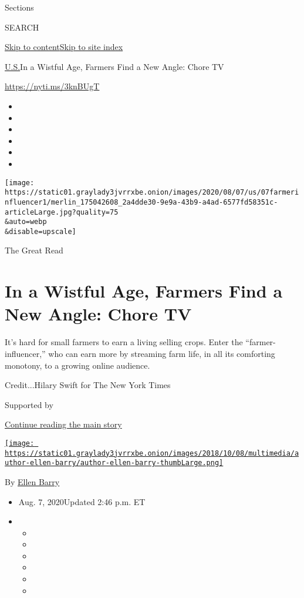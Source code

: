 Sections

SEARCH

\protect\hyperlink{site-content}{Skip to
content}\protect\hyperlink{site-index}{Skip to site index}

\href{/section/us}{U.S.}\textbar{}In a Wistful Age, Farmers Find a New
Angle: Chore TV

\url{https://nyti.ms/3knBUgT}

\begin{itemize}
\item
\item
\item
\item
\item
\item
\end{itemize}

\texttt{[image: https://static01.graylady3jvrrxbe.onion/images/2020/08/07/us/07farmerinfluencer1/merlin\_175042608\_2a4dde30-9e9a-43b9-a4ad-6577fd58351c-articleLarge.jpg?quality=75\\\&auto=webp\\\&disable=upscale]}

The Great Read

\hypertarget{in-a-wistful-age-farmers-find-a-new-angle-chore-tv}{%
\section{In a Wistful Age, Farmers Find a New Angle: Chore
TV}\label{in-a-wistful-age-farmers-find-a-new-angle-chore-tv}}

It's hard for small farmers to earn a living selling crops. Enter the
``farmer-influencer,'' who can earn more by streaming farm life, in all
its comforting monotony, to a growing online audience.

Credit...Hilary Swift for The New York Times

Supported by

\protect\hyperlink{after-sponsor}{Continue reading the main story}

\href{https://www.nytimes3xbfgragh.onion/by/ellen-barry}{\texttt{[image: https://static01.graylady3jvrrxbe.onion/images/2018/10/08/multimedia/author-ellen-barry/author-ellen-barry-thumbLarge.png]}}

By \href{https://www.nytimes3xbfgragh.onion/by/ellen-barry}{Ellen Barry}

\begin{itemize}
\item
  Aug. 7, 2020Updated 2:46 p.m. ET
\item
  \begin{itemize}
  \item
  \item
  \item
  \item
  \item
  \item
  \end{itemize}
\end{itemize}

